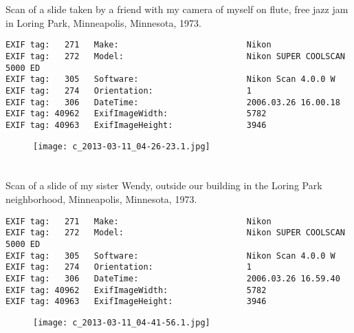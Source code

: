 \clearpage
\section{\protect{}}
\noindent Scan of a slide taken by a friend with my camera of myself on flute, free jazz jam in Loring Park, Minneapolis, Minnesota, 1973.
\noindent
\begin{lstlisting}
EXIF tag:   271   Make:                          Nikon
EXIF tag:   272   Model:                         Nikon SUPER COOLSCAN 5000 ED
EXIF tag:   305   Software:                      Nikon Scan 4.0.0 W
EXIF tag:   274   Orientation:                   1
EXIF tag:   306   DateTime:                      2006.03.26 16.00.18
EXIF tag: 40962   ExifImageWidth:                5782
EXIF tag: 40963   ExifImageHeight:               3946

\end{lstlisting}
\clearpage
\begin{figure}
\raggedleft
\texttt{[image: c\_2013-03-11\_04-26-23.1.jpg]}
\end{figure}


\clearpage
\section{\protect{}}
\noindent Scan of a slide of my sister Wendy, outside our building in the Loring Park neighborhood, Minneapolis, Minnesota, 1973.
\noindent
\begin{lstlisting}
EXIF tag:   271   Make:                          Nikon
EXIF tag:   272   Model:                         Nikon SUPER COOLSCAN 5000 ED
EXIF tag:   305   Software:                      Nikon Scan 4.0.0 W
EXIF tag:   274   Orientation:                   1
EXIF tag:   306   DateTime:                      2006.03.26 16.59.40
EXIF tag: 40962   ExifImageWidth:                5782
EXIF tag: 40963   ExifImageHeight:               3946

\end{lstlisting}
\clearpage
\begin{figure}
\raggedleft
\texttt{[image: c\_2013-03-11\_04-41-56.1.jpg]}
\end{figure}


\clearpage
